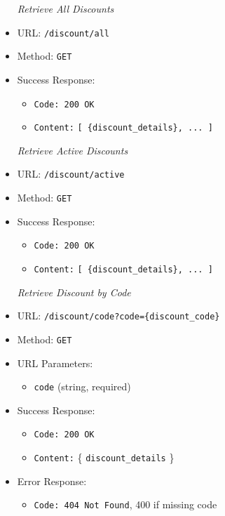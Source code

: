 \begin{itemize}
\begin{itemize}
\begin{itemize}
\begin{itemize}
  \item[\textit{Retrieve All Discounts}]
  \item URL: \texttt{/discount/all}  
  \item Method: \texttt{GET}  
  \item Success Response:
  \begin{itemize}
    \item \texttt{Code: 200 OK}  
    \item \texttt{Content:} \texttt{[ \{discount\_details\}, ... ]}
  \end{itemize}
  
  \item[\textit{Retrieve Active Discounts}]
  \item URL: \texttt{/discount/active}  
  \item Method: \texttt{GET}  
  \item Success Response:
  \begin{itemize}
    \item \texttt{Code: 200 OK}  
    \item \texttt{Content:} \texttt{[ \{discount\_details\}, ... ]}
  \end{itemize}
  
  \item[\textit{Retrieve Discount by Code}]
  \item URL: \texttt{/discount/code?code=\{discount\_code\}}  
  \item Method: \texttt{GET}  
  \item URL Parameters:
  \begin{itemize}
    \item \texttt{code} (string, required)
  \end{itemize}
  \item Success Response:
  \begin{itemize}
    \item \texttt{Code: 200 OK}  
    \item \texttt{Content:} \{ \texttt{discount\_details} \}
  \end{itemize}
  \item Error Response:
  \begin{itemize}
    \item \texttt{Code: 404 Not Found}, 400 if missing code
  \end{itemize}
  

\end{itemize}
\end{itemize}
\end{itemize}
\end{itemize}
